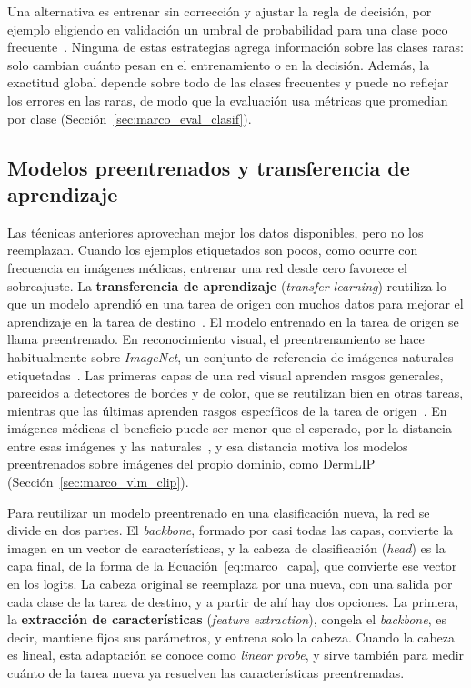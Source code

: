 Una alternativa es entrenar sin corrección y ajustar la regla de decisión, por ejemplo eligiendo en validación
un umbral de probabilidad para una clase poco frecuente~\cite{buda2018systematic}. Ninguna de estas estrategias
agrega información sobre las clases raras: solo cambian cuánto pesan en el entrenamiento o en la decisión.
Además, la exactitud global depende sobre todo de las clases frecuentes y puede no reflejar los errores en las
raras, de modo que la evaluación usa métricas que promedian por clase (Sección~\ref{sec:marco_eval_clasif}).

\subsection{Modelos preentrenados y transferencia de aprendizaje}
\label{sec:marco_transferencia}

Las técnicas anteriores aprovechan mejor los datos disponibles, pero no los reemplazan. Cuando los ejemplos
etiquetados son pocos, como ocurre con frecuencia en imágenes médicas, entrenar una red desde cero favorece el
sobreajuste. La \textbf{transferencia de aprendizaje} (\emph{transfer learning}) reutiliza lo que un modelo
aprendió en una tarea de origen con muchos datos para mejorar el aprendizaje en la tarea de
destino~\cite{pan2010survey}. El modelo entrenado en la tarea de origen se llama preentrenado. En reconocimiento
visual, el preentrenamiento se hace habitualmente sobre \emph{ImageNet}, un conjunto de referencia de imágenes
naturales etiquetadas~\cite{russakovsky2015imagenet}. Las primeras capas de una red visual aprenden rasgos
generales, parecidos a detectores de bordes y de color, que se reutilizan bien en otras tareas, mientras que las
últimas aprenden rasgos específicos de la tarea de origen~\cite{yosinski2014transferable}. En imágenes médicas el
beneficio puede ser menor que el esperado, por la distancia entre esas imágenes y las
naturales~\cite{raghu2019transfusion}, y esa distancia motiva los modelos preentrenados sobre imágenes del propio
dominio, como DermLIP (Sección~\ref{sec:marco_vlm_clip}).

Para reutilizar un modelo preentrenado en una clasificación nueva, la red se divide en dos partes. El
\emph{backbone}, formado por casi todas las capas, convierte la imagen en un vector de características, y la
cabeza de clasificación (\emph{head}) es la capa final, de la forma de la Ecuación~\ref{eq:marco_capa}, que
convierte ese vector en los logits. La cabeza original se reemplaza por una nueva, con una salida por cada clase
de la tarea de destino, y a partir de ahí hay dos opciones. La primera, la \textbf{extracción de
características} (\emph{feature extraction}), congela el \emph{backbone}, es decir, mantiene fijos sus
parámetros, y entrena solo la cabeza. Cuando la cabeza es lineal, esta adaptación se conoce como \emph{linear
probe}, y sirve también para medir cuánto de la tarea nueva ya resuelven las características preentrenadas.

